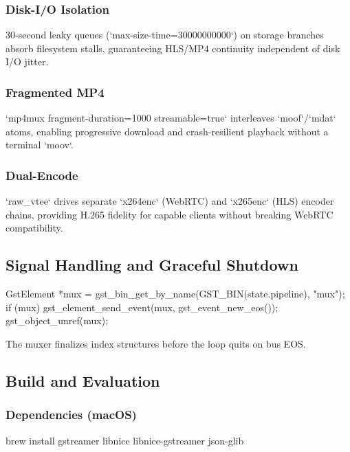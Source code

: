 \documentclass{article}
\let\originalfootnotesize\footnotesize
\let\oldverbatim\verbatim
\let\oldendverbatim\endverbatim
\renewenvironment{verbatim}{\originalfootnotesize\oldverbatim}{\oldendverbatim}
\begin{document}
\subsubsection{Disk-I/O Isolation}

30-second leaky queues (`max-size-time=30000000000`) on storage branches absorb
filesystem stalls, guaranteeing HLS/MP4 continuity independent of disk I/O jitter.

\subsubsection{Fragmented MP4}

`mp4mux fragment-duration=1000 streamable=true` interleaves `moof`/`mdat` atoms,
enabling progressive download and crash-resilient playback without a terminal `moov`.

\subsubsection{Dual-Encode}

`raw\_vtee` drives separate `x264enc` (WebRTC) and `x265enc` (HLS) encoder chains,
providing H.265 fidelity for capable clients without breaking WebRTC compatibility.

\subsection{Signal Handling and Graceful Shutdown}

\begin{verbatim}
GstElement *mux = gst_bin_get_by_name(GST_BIN(state.pipeline), "mux");
if (mux) {
    gst_element_send_event(mux, gst_event_new_eos());
    gst_object_unref(mux);
}
\end{verbatim}

The muxer finalizes index structures before the loop quits on bus EOS.

\subsection{Build and Evaluation}

\subsubsection{Dependencies (macOS)}

\begin{verbatim}
brew install gstreamer libnice libnice-gstreamer json-glib
\end{verbatim}
\end{document}
